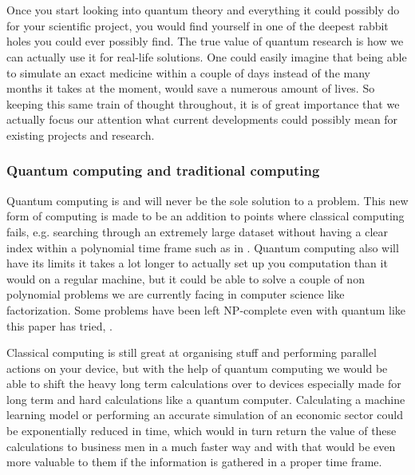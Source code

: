 
\chapter{}
\label{ch:computing-with-quantum}


Once you start looking into quantum theory and everything it could possibly do for your scientific project, you would find yourself in one of the deepest rabbit holes you could ever possibly find. The true value of quantum research is how we can actually use it for real-life solutions. One could easily imagine that being able to simulate an exact medicine within a couple of days instead of the many months it takes at the moment, would save a numerous amount of lives. So keeping this same train of thought throughout, it is of great importance that we actually focus our attention what current developments could possibly mean for existing projects and research.

\subsection{Quantum computing and traditional computing}

Quantum computing is and will never be the sole solution to a problem. This new form of computing is made to be an addition to points where classical computing fails, e.g. searching through an extremely large dataset without having a clear index within a polynomial time frame such as in \textcite{Terhal1998}. Quantum computing also will have its limits it takes a lot longer to actually set up you computation than it would on a regular machine, but it could be able to solve a couple of non polynomial problems we are currently facing in computer science like factorization. Some problems have been left NP-complete even with quantum like this paper has tried, \textcite{Wang2007}.

Classical computing is still great at organising stuff and performing parallel actions on your device, but with the help of quantum computing we would be able to shift the heavy long term calculations over to devices especially made for long term and hard calculations like a quantum computer. Calculating a machine learning model or performing an accurate simulation of an economic sector could be exponentially reduced in time, which would in turn return the value of these calculations to business men in a much faster way and with that would be even more valuable to them if the information is gathered in a proper time frame. \autocite{Schuld2015} \autocite{Troyer2005}

